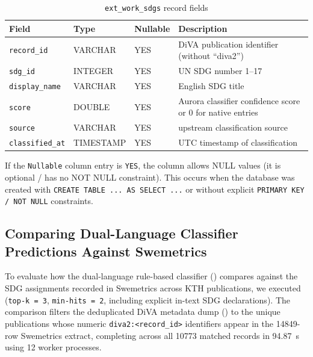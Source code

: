 \begin{table}[!ht]
  \centering
  \caption{\texttt{ext\_work\_sdgs} record fields}
  \label{tab:sdgRecordFields}
  \begin{tabular}{l l l l}
    \toprule
    \textbf{Field} & \textbf{Type} & \textbf{Nullable} & \textbf{Description} \\
    \midrule
    \texttt{record\_id}     & VARCHAR   & YES & \gls{DiVA} publication identifier (without \enquote{diva2}) \\
    \texttt{sdg\_id}        & INTEGER   & YES & \gls{UN} \gls{SDG} number 1--17 \\
    \texttt{display\_name}  & VARCHAR   & YES & English \gls{SDG} title \\
    \texttt{score}          & DOUBLE    & YES & Aurora classifier confidence score or \num{0} for native entries \\
    \texttt{source}         & VARCHAR   & YES & upstream classification source \\
    \texttt{classified\_at} & TIMESTAMP & YES & UTC timestamp of classification \\
    \bottomrule
  \end{tabular}
\end{table}
\FloatBarrier

If the \texttt{Nullable} column entry is \texttt{YES}, the column allows NULL values (\ie it is optional / has no NOT NULL constraint). This occurs when the database was created with \texttt{CREATE TABLE ... AS SELECT ...} or without explicit \texttt{PRIMARY KEY / NOT NULL} constraints.


\subsection{Comparing Dual-Language Classifier Predictions Against Swemetrics}
\label{sec:SwemetricsComparisonProtocol}

To evaluate how the dual-language rule-based classifier () compares against the SDG assignments recorded in Swemetrics across \gls{KTH} publications, we executed  (\texttt{top-k = 3}, \texttt{min-hits = 2}, including explicit in-text \gls{SDG} declarations). The comparison filters the deduplicated \gls{DiVA} metadata dump () to the unique publications whose numeric \texttt{diva2:<record\_id>} identifiers appear in the \num{14849}-row Swemetrics extract, completing across all \num{10773} matched records in \qty{94.87}{\second} using \num{12} worker processes.

